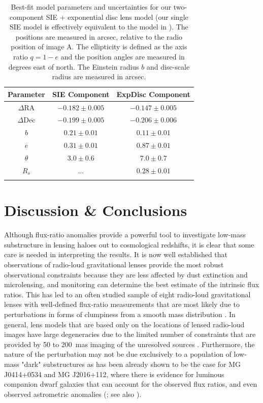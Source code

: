 \documentclass[a4paper,fleqn,usenatbib,useAMS]{mnras}
\begin{document}
\begin{table}
\centering
\caption{Best-fit model parameters and uncertainties for our two-component SIE + exponential disc lens model (our single SIE model is effectively equivalent to the model in \citet{Marlow99}). The positions are measured in arcsec, relative to the radio position of image A. The ellipticity is defined as the axis ratio $q=1-e$ and the position angles are measured in degrees east of north. The Einstein radius $b$ and disc-scale radius are measured in arcsec.}
\begin{tabular}{ccc}
\hline 
Parameter    & SIE Component & ExpDisc Component  \\
\hline
$\Delta$RA	& $-0.182 \pm 0.005$		& $-0.147 \pm 0.005$\\
$\Delta$Dec	& $-0.199 \pm 0.005$		& $-0.206 \pm 0.006$ \\
$b$ 			& $0.21 \pm 0.01$  		& $0.11 \pm 0.01$  \\
$e$	  		& $0.31 \pm 0.01$			& $0.87 \pm 0.01$ \\
$\theta$ 		& $3.0 \pm 0.6$			& $7.0 \pm 0.7$	 \\
$R_s$			& ...  						& $0.28 \pm 0.01$	 \\
\hline
\label{tab:model}
\end{tabular}
\end{table}


\section{Discussion \& Conclusions}

Although flux-ratio anomalies provide a powerful tool to investigate low-mass substructure in lensing haloes out to cosmological redshifts, it is clear that some care is needed in interpreting the results. It is now well established that observations of radio-loud gravitational lenses provide the most robust observational constraints because they are less affected by dust extinction and microlensing, and monitoring can determine the best estimate of the intrinsic flux ratios. This has led to an often studied sample of eight radio-loud gravitational lenses with well-defined flux-ratio measurements that are most likely due to perturbations in forms of clumpiness from a smooth mass distribution \citep{Dalal2002,KD04,Xu15}. In general, lens models that are based only on the locations of lensed radio-loud images have large degeneracies due to the limited number of constraints that are provided by 50 to 200~mas imaging of the unresolved sources \citep[e.g.][]{Ka91}. Furthermore, the nature of the perturbation may not be due exclusively to a population of low-mass "dark" substructures as has been already shown to be the case for MG J0414+0534 and MG J2016+112, where there is evidence for luminous companion dwarf galaxies that can account for the observed flux ratios, and even observed astrometric anomalies (\citealt{ros00,chen07,more09}; see also \citealt{mckean07,jackson10}). 
\end{document}
